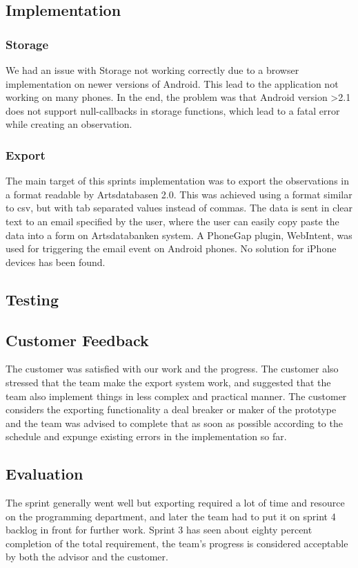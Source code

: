 	\subsection{Implementation}
    \subsubsection{Storage}
    We had an issue with Storage not working correctly due to a browser implementation on newer versions of Android. This lead to the application not working on many  phones. In the end, the problem was that Android version >2.1 does not support null-callbacks in storage functions, which lead to a fatal error while creating an observation. 

    \subsubsection{Export}
    The main target of this sprints implementation was to export the observations in a format readable by Artsdatabasen 2.0. This was achieved using a format similar to csv, but with tab separated values instead of commas. The data is sent in clear text to an email specified by the user, where the user can easily copy paste the data into a form on Artsdatabanken system. A PhoneGap plugin, WebIntent, was used for triggering the email event on Android phones. No solution for iPhone devices has been found.

	\subsection{Testing}

	\subsection{Customer Feedback}
The customer was satisfied with our work and the progress. The customer also stressed that the team make the export system work, and suggested that the team also implement things in less complex and practical manner. The customer considers the exporting functionality a deal breaker or maker of the prototype and the team was advised to complete that as soon as possible according to the schedule and expunge existing errors in the implementation so far.
	\subsection{Evaluation}
The sprint generally went well but exporting required a lot of time and resource on the programming department, and later the team had to put it on sprint 4 backlog in front for further work. Sprint 3 has seen about eighty percent completion of the total requirement, the team's progress is considered acceptable by both the advisor and the customer. 
